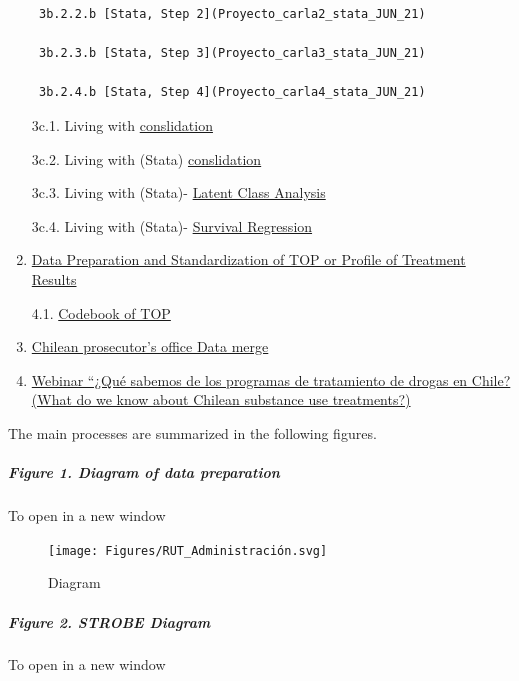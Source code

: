 \documentclass[
]{article}
\begin{document}
\begin{enumerate}
\begin{verbatim}
 3b.2.2.b [Stata, Step 2](Proyecto_carla2_stata_JUN_21)

 3b.2.3.b [Stata, Step 3](Proyecto_carla3_stata_JUN_21)

 3b.2.4.b [Stata, Step 4](Proyecto_carla4_stata_JUN_21)
\end{verbatim}

  3c.1. Living with \href{analisis_joel2}{conslidation}

  3c.2. Living with (Stata)
  \href{analisis_joel_oct_2021_stata1}{conslidation}

  3c.3. Living with (Stata)- \href{analisis_joel_oct_2021_stata2}{Latent
  Class Analysis}

  3c.4. Living with (Stata)-
  \href{analisis_joel_oct_2021_stata3}{Survival Regression}
\item
  \href{Data_prep_TOP}{Data Preparation and Standardization of TOP or
  Profile of Treatment Results}

  4.1. \href{codebook_TOP}{Codebook of TOP}
\item
  \href{Fiscalia_merge}{Chilean prosecutor's office Data merge}
\item
  \href{https://youtu.be/xuROIbzEw5I}{Webinar ``¿Qué sabemos de los
  programas de tratamiento de drogas en Chile? (What do we know about
  Chilean substance use treatments?)}
\end{enumerate}

The main processes are summarized in the following figures.

\hypertarget{figure-1.-diagram-of-data-preparation}{%
\subparagraph{Figure 1. Diagram of data
preparation}\label{figure-1.-diagram-of-data-preparation}}

To open in a new window

\begin{figure}
\centering
\texttt{[image: Figures/RUT\_Administración.svg]}
\caption{Diagram}
\end{figure}

\hypertarget{figure-2.-strobe-diagram}{%
\subparagraph{Figure 2. STROBE Diagram}\label{figure-2.-strobe-diagram}}

To open in a new window
\end{document}

